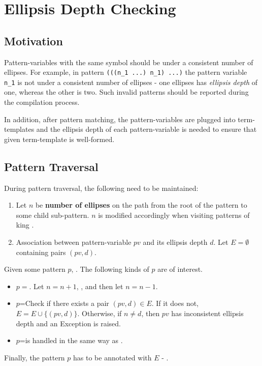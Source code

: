 \section{Ellipsis Depth Checking}

\subsection{Motivation}

Pattern-variables with the same symbol should be under a consistent number of ellipses. For example, in pattern \texttt{(((n\_1 ...) n\_1) ...)} the pattern variable \texttt{n\_1} is not under a consistent number of ellipses - one ellipses has \textit{ellipsis depth} of one, whereas the other is two. Such invalid patterns should be reported during the compilation process.

In addition, after pattern matching, the pattern-variables are plugged into term-templates and the ellipsis depth of each pattern-variable is needed to ensure that given term-template is well-formed.

\subsection{Pattern Traversal}

During pattern traversal, the following need to be maintained:

\begin{enumerate}
\item
Let $n$ be \textbf{number of ellipses} on the path from the root of the pattern to some child sub-pattern. $n$ is modified accordingly when visiting patterns of king \RepeatNoArg.

\item Association between pattern-variable $pv$ and its ellipsis depth $d$. Let $E=\emptyset$ containing pairs $(pv, d)$.
\end{enumerate}

Given some pattern $p$, . The following kinds of $p$ are of interest.
\begin{itemize}
\item $p=$\PatternRepeat. Let $n=n+1$, , and then let $n=n-1$.
\item $p$=\BuiltInPattern Check if there exists a pair $(pv, d) \in E$. If it does not, $E = E \cup \{ (pv, d) \}$. Otherwise, if $n \neq d$, then $pv$ has inconsistent ellipsis depth and an Exception is raised.
\item $p$=\NonTerminal is handled in the same way as \BuiltInPatternNoArg.
\end{itemize}

Finally, the pattern $p$ has to be annotated with $E$ - .
